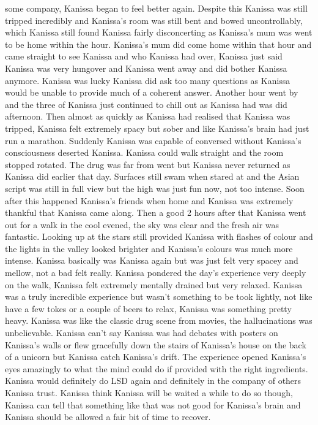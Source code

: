 \documentclass[12pt]{book}
\begin{document}
some company, Kanissa began to feel better again. Despite this Kanissa was still tripped incredibly and Kanissa's room was still bent and bowed uncontrollably, which Kanissa still found Kanissa fairly disconcerting as Kanissa's mum was went to be home within the hour. Kanissa's mum did come home within that hour and came straight to see Kanissa and who Kanissa had over, Kanissa just said Kanissa was very hungover and Kanissa went away and did bother Kanissa anymore. Kanissa was lucky Kanissa did ask too many questions as Kanissa would be unable to provide much of a coherent answer. Another hour went by and the three of Kanissa just continued to chill out as Kanissa had was did afternoon. Then almost as quickly as Kanissa had realised that Kanissa was tripped, Kanissa felt extremely spacy but sober and like Kanissa's brain had just run a marathon. Suddenly Kanissa was capable of conversed without Kanissa's consciousness deserted Kanissa. Kanissa could walk straight and the room stopped rotated. The drug was far from went but Kanissa never returned as Kanissa did earlier that day. Surfaces still swam when stared at and the Asian script was still in full view but the high was just fun now, not too intense. Soon after this happened Kanissa's friends when home and Kanissa was extremely thankful that Kanissa came along. Then a good 2 hours after that Kanissa went out for a walk in the cool evened, the sky was clear and the fresh air was fantastic. Looking up at the stars still provided Kanissa with flashes of colour and the lights in the valley looked brighter and Kanissa's colours was much more intense. Kanissa basically was Kanissa again but was just felt very spacey and mellow, not a bad felt really. Kanissa pondered the day's experience very deeply on the walk, Kanissa felt extremely mentally drained but very relaxed. Kanissa was a truly incredible experience but wasn't something to be took lightly, not like have a few tokes or a couple of beers to relax, Kanissa was something pretty heavy. Kanissa was like the classic drug scene from movies, the hallucinations was unbelievable. Kanissa can't say Kanissa was had debates with posters on Kanissa's walls or flew gracefully down the stairs of Kanissa's house on the back of a unicorn but Kanissa catch Kanissa's drift. The experience opened Kanissa's eyes amazingly to what the mind could do if provided with the right ingredients. Kanissa would definitely do LSD again and definitely in the company of others Kanissa trust. Kanissa think Kanissa will be waited a while to do so though, Kanissa can tell that something like that was not good for Kanissa's brain and Kanissa should be allowed a fair bit of time to recover.
\end{document}

